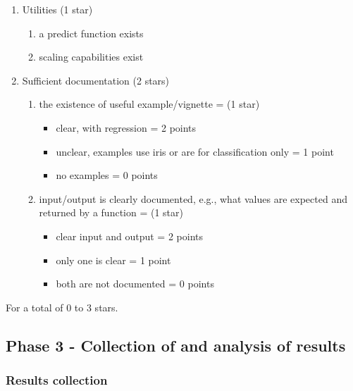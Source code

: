 \begin{enumerate}
\def\labelenumi{(\arabic{enumi})}
\tightlist
\item
  Utilities (1 star)

  \begin{enumerate}
  \def\labelenumii{(\alph{enumii})}
  \tightlist
  \item
    a predict function exists\\
  \item
    scaling capabilities exist
  \end{enumerate}
\item
  Sufficient documentation (2 stars)

  \begin{enumerate}
  \def\labelenumii{(\alph{enumii})}
  \tightlist
  \item
    the existence of useful example/vignette = (1 star)

    \begin{itemize}
    \tightlist
    \item
      clear, with regression = 2 points
    \item
      unclear, examples use iris or are for classification only = 1
      point
    \item
      no examples = 0 points
    \end{itemize}
  \item
    input/output is clearly documented, e.g., what values are expected
    and returned by a function = (1 star)

    \begin{itemize}
    \tightlist
    \item
      clear input and output = 2 points
    \item
      only one is clear = 1 point
    \item
      both are not documented = 0 points
    \end{itemize}
  \end{enumerate}
\end{enumerate}

For a total of 0 to 3 stars.

\hypertarget{phase-3---collection-of-and-analysis-of-results}{%
\subsection{Phase 3 - Collection of and analysis of
results}\label{phase-3---collection-of-and-analysis-of-results}}

\hypertarget{results-collection}{%
\subsubsection{Results collection}\label{results-collection}}

